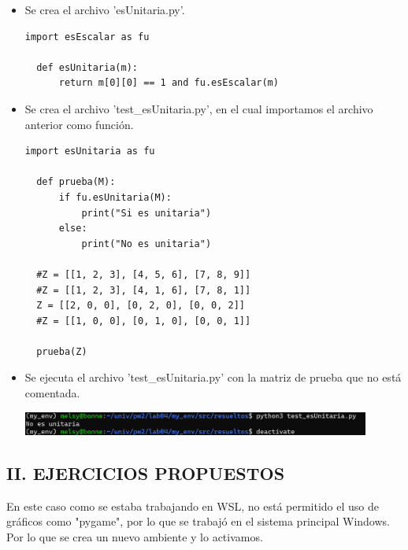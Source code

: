 \documentclass{article}
\begin{document}
  \begin{itemize}
  
  \item Se crea el archivo 'esUnitaria.py'.

  \begin{lstlisting}[style=python]
  import esEscalar as fu

  def esUnitaria(m):
      return m[0][0] == 1 and fu.esEscalar(m)
  \end{lstlisting}

    
  \item Se crea el archivo 'test\_esUnitaria.py', en el cual importamos el archivo anterior como función.
    
  \begin{lstlisting}[style=python]
  import esUnitaria as fu

  def prueba(M):
      if fu.esUnitaria(M):
          print("Si es unitaria")
      else:
          print("No es unitaria")

  #Z = [[1, 2, 3], [4, 5, 6], [7, 8, 9]]
  #Z = [[1, 2, 3], [4, 1, 6], [7, 8, 1]]
  Z = [[2, 0, 0], [0, 2, 0], [0, 0, 2]]
  #Z = [[1, 0, 0], [0, 1, 0], [0, 0, 1]]

  prueba(Z)
  \end{lstlisting}

  \item Se ejecuta el archivo 'test\_esUnitaria.py' con la matriz de prueba que no está comentada.

  \begin{minipage}{\linewidth}
    \centering
    \includegraphics[width=0.9\textwidth]{imagenes/r_unitaria.png}
  \end{minipage}

  \end{itemize}

\pagebreak

\subsection*{II. EJERCICIOS PROPUESTOS}

  \vspace{\baselineskip}

  En este caso como se estaba trabajando en WSL, no está permitido el uso de gráficos como "pygame", por lo que se trabajó en el sistema principal Windows. Por lo que se crea un nuevo ambiente y lo activamos.
  
\end{document}

